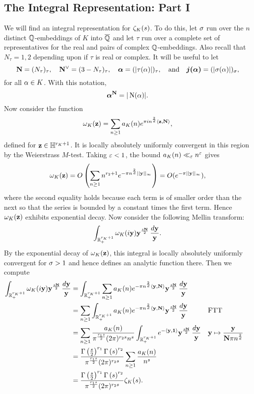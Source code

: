     \subsection*{The Integral Representation: Part I}
      We will find an integral representation for $\zeta_{K}(s)$. To do this, let $\sigma$ run over the $n$ distinct $\mathbb{Q}$-embeddings of $K$ into $\overline{\mathbb{Q}}$ and let $\tau$ run over a complete set of representatives for the real and pairs of complex $\mathbb{Q}$-embeddings. Also recall that $N_{\tau} = 1,2$ depending upon if $\tau$ is real or complex. It will be useful to let
      \[
        \mathbf{N} = (N_{\tau})_{\tau}, \quad \mathbf{N}^{\vee} = (3-N_{\tau})_{\tau}, \quad \boldsymbol{\alpha} = (|\tau(\alpha)|)_{\tau},  \quad \text{and} \quad \boldsymbol{j(\alpha)} = (|\sigma(\alpha)|)_{\sigma},
      \]
      for all $\alpha \in K$. With this notation,
      \[
        \boldsymbol{\alpha}^{\mathbf{N}} = |\operatorname{\mathrm{N}}(\alpha)|.
      \]
      Now consider the function
      \[
        \omega_{K}(\mathbf{z}) = \sum_{n \ge 1}a_{K}(n)e^{\pi in^{\frac{2}{d}}\langle\mathbf{z},\mathbf{N}\rangle},
      \]
      defined for $\mathbf{z} \in \mathbb{H}^{r_{K}+1}$. It is locally absolutely uniformly convergent in this region by the Weierstrass $M$-test. Taking $\varepsilon < 1$, the bound $a_{K}(n) \ll_{\varepsilon} n^{\varepsilon}$ gives
      \[
        \omega_{K}(\mathbf{z}) = O\left(\sum_{n \ge 1}n^{r_{2}+1}e^{-\pi n^{\frac{2}{d}}||\mathbf{y}||_{\infty}}\right) = O(e^{-\pi||\mathbf{y}||_{\infty}}),
      \]
      where the second equality holds because each term is of smaller order than the next so that the series is bounded by a constant times the first term. Hence $\omega_{K}(\mathbf{z})$ exhibits exponential decay. Now consider the following Mellin transform:
      \[
        \int_{\mathbb{R}_{+}^{r_{K}+1}}\omega_{K}(i\mathbf{y})\mathbf{y}^{\frac{s\mathbf{N}}{2}}\,\frac{d\mathbf{y}}{\mathbf{y}}.
      \]
      By the exponential decay of $\omega_{K}(\mathbf{z})$, this integral is locally absolutely uniformly convergent for $\sigma > 1$ and hence defines an analytic function there. Then we compute
      \begin{align*}
        \int_{\mathbb{R}_{+}^{r_{K}+1}}\omega_{K}(i\mathbf{y})\mathbf{y}^{\frac{s\mathbf{N}}{2}}\,\frac{d\mathbf{y}}{\mathbf{y}} &= \int_{\mathbb{R}_{+}^{r_{K}+1}}\sum_{n \ge 1}a_{K}(n)e^{-\pi n^{\frac{2}{d}}\langle\mathbf{y},\mathbf{N}\rangle}\mathbf{y}^{\frac{s\mathbf{N}}{2}}\,\frac{d\mathbf{y}}{\mathbf{y}} \\
        &= \sum_{n \ge 1}\int_{\mathbb{R}_{+}^{r_{K}+1}}a_{K}(n)e^{-\pi n^{\frac{2}{d}}\langle\mathbf{y},\mathbf{N}\rangle}\mathbf{y}^{\frac{s\mathbf{N}}{2}}\,\frac{d\mathbf{y}}{\mathbf{y}} && \text{FTT} \\
        &= \sum_{n \ge 1}\frac{a_{K}(n)}{\pi^{\frac{r_{1}s}{2}}(2\pi)^{r_{2}s}n^{s}}\int_{\mathbb{R}_{+}^{r_{K}+1}}e^{-\langle\mathbf{y},\mathbf{1}\rangle}\mathbf{y}^{\frac{s\mathbf{N}}{2}}\,\frac{d\mathbf{y}}{\mathbf{y}} && \text{$\mathbf{y} \mapsto \frac{\mathbf{y}}{\mathbf{N}\pi n^{\frac{2}{d}}}$} \\
        &= \frac{\Gamma\left(\frac{s}{2}\right)^{r_{1}}\Gamma\left(s\right)^{r_{2}}}{\pi^{\frac{r_{1}s}{2}}(2\pi)^{r_{2}s}}\sum_{n \ge 1}\frac{a_{K}(n)}{n^{s}} \\
        &= \frac{\Gamma\left(\frac{s}{2}\right)^{r_{1}}\Gamma\left(s\right)^{r_{2}}}{\pi^{\frac{r_{1}s}{2}}(2\pi)^{r_{2}s}}\zeta_{K}(s).
      \end{align*}
